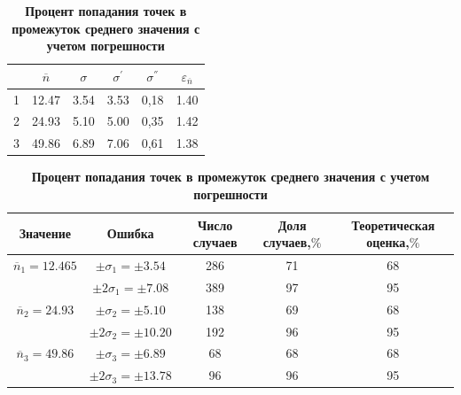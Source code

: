 \documentclass[a4paper, 12pt]{article}
\begin{document}
\newpage
\begin{table}
\caption{\textbf{Ошибки и средние значения}}
\begin{tabular}{|c|c|c|c|c|c|}
\hline
&$\overline{n}$&$\sigma$&$\sigma^{'}$&$\sigma^{''}$&$\varepsilon_{\overline{n}}$\\
\hline
1&12.47&3.54&3.53&0,18&1.40 \\
\hline
2&24.93&5.10&5.00&0,35&1.42\\
\hline
3&49.86&6.89&7.06&0,61&1.38 \\
\hline
\end{tabular}
\caption{\textbf{Процент попадания точек в промежуток среднего значения с учетом погрешности}}
\begin{tabular}{|c|c|c|c|c|}
\hline
Значение&Ошибка&Число случаев&Доля случаев,$\%$&Теоретическая оценка,$\%$ \\
\hline
$\overline{n}_1 = 12.465$ & $\pm \sigma_1 = \pm 3.54$ & 286 & 71 & 68 \\
& $\pm 2 \sigma_1 = \pm 7.08$ & 389 & 97 & 95 \\
\hline
$\overline{n}_2 = 24.93$ & $\pm  \sigma_2 = \pm 5.10$ & 138 & 69 & 68 \\
& $\pm 2 \sigma_2 = \pm 10.20$ & 192 & 96 & 95 \\
\hline
$\overline{n}_3 = 49.86$ & $\pm  \sigma_3 = \pm 6.89$ & 68 & 68 & 68 \\
& $\pm 2 \sigma_3 = \pm 13.78$ & 96 & 96 & 95 \\
\hline
\end{tabular}
\end{table}
\end{document}
